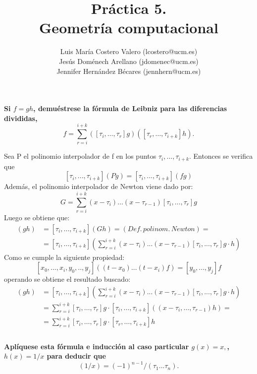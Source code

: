 \documentclass[12pt,a4paper]{article}
\title{Práctica 5. \\ Geometría computacional}
\author{Luis María Costero Valero (lcostero@ucm.es)\\ Jesús Doménech
  Arellano (jdomenec@ucm.es) \\ Jennifer Hernández Bécares (jennhern@ucm.es)}
\date{}
\begin{document}
\maketitle
\onehalfspace

\textbf{Si $f=gh$, demuéstrese la fórmula de Leibniz para las diferencias divididas,}
\begin{equation*}
  [\tau_i,\dots,\tau_{i+k}]f=\sum\limits_{r=i}^{i+k}([\tau_i,\dots,\tau_r]g)([\tau_r,\dots,\tau_{i+k}]h).
\end{equation*}

Sea P el polinomio interpolador de f en los puntos $\tau_i, ... ,
\tau_{i+k}$. Entonces se verifica que $$[\tau_{i}, ..., \tau_{i+k}](Pg) =
[\tau_i, ..., \tau_{i+k}](fg)$$
Además, el polinomio interpolador de Newton viene dado por:
$$ G = \sum\limits^{i+k}_{r=i}(x-\tau_i)\dots(x-\tau_{r-1})[\tau_i,\dots,\tau_{r}]g$$
Luego se obtiene que:
\begin{align*}
  [\tau_i,\dots,\tau_{i+k}](gh) &= [\tau_i,\dots,\tau_{i+k}](Gh) = (Def.\,polinom.\,Newton)=\\
                      &= [\tau_i,\dots,\tau_{i+k}]\left(\sum\limits_{r=i}^{i+k}(x-\tau_i)...(x-\tau_{r-1})[\tau_i,...,\tau_r]g
                        \cdot h\right)
\end{align*}
Como se cumple la siguiente propiedad:
$$[x_0, ..., x_i, y_0, .., y_j]((t-x_0)...(t-x_i)f) = [y_0,...,y_j]f$$
operando se obtiene el resultado buscado:
\begin{align*}
  [\tau_i,\dots,\tau_{i+k}](gh) &=
                                  [\tau_i,\dots,\tau_{i+k}]\left(\sum\limits_{r=i}^{i+k}(x-\tau_i)...(x-\tau_{r-1})[\tau_i,...,\tau_r]g
                                  \cdot h\right)\\
                      &=\sum\limits^{i+k}_{r=i}[\tau_i,\dots,\tau_{r}]g \cdot
                        [\tau_i,\dots,\tau_{i+k}]\left((x-\tau_i,\dots,\tau_{r-1})h\right)=\\
                      &=\sum\limits^{i+k}_{r=i}[\tau_i,\dots,\tau_r]g \cdot [\tau_r,
                        \dots, \tau_{i+k}]h\\
\end{align*}\\

\textbf{Aplíquese esta fórmula e inducción al caso particular $g(x)=x,$, $h(x)=1/x$ para deducir que}
\begin{equation*}
  [\tau_1,...,\tau_n](1/x)=(-1)^{n-1}/(\tau_1...\tau_n).
\end{equation*}
\end{document}

